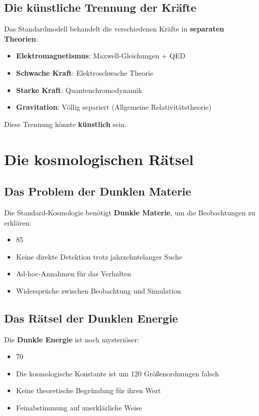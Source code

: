 \documentclass[12pt,a4paper]{report}
\begin{document}
	\subsection{Die künstliche Trennung der Kräfte}
	
	Das Standardmodell behandelt die verschiedenen Kräfte in \textbf{separaten Theorien}:
	
	\begin{itemize}
		\item \textbf{Elektromagnetismus}: Maxwell-Gleichungen + QED
		\item \textbf{Schwache Kraft}: Elektroschwache Theorie
		\item \textbf{Starke Kraft}: Quantenchromodynamik
		\item \textbf{Gravitation}: Völlig separiert (Allgemeine Relativitätstheorie)
	\end{itemize}
	
	Diese Trennung könnte \textbf{künstlich} sein.
	
	\section{Die kosmologischen Rätsel}
	
	\subsection{Das Problem der Dunklen Materie}
	
	Die Standard-Kosmologie benötigt \textbf{Dunkle Materie}, um die Beobachtungen zu erklären:
	
	\begin{itemize}
		\item 85%
		\item Keine direkte Detektion trotz jahrzehntelanger Suche
		\item Ad-hoc-Annahmen für das Verhalten
		\item Widersprüche zwischen Beobachtung und Simulation
	\end{itemize}
	
	\subsection{Das Rätsel der Dunklen Energie}
	
	Die \textbf{Dunkle Energie} ist noch mysteriöser:
	
	\begin{itemize}
		\item 70%
		\item Die kosmologische Konstante ist um 120 Größenordnungen falsch
		\item Keine theoretische Begründung für ihren Wert
		\item Feinabstimmung auf unerklärliche Weise
	\end{itemize}
	
\end{document}
